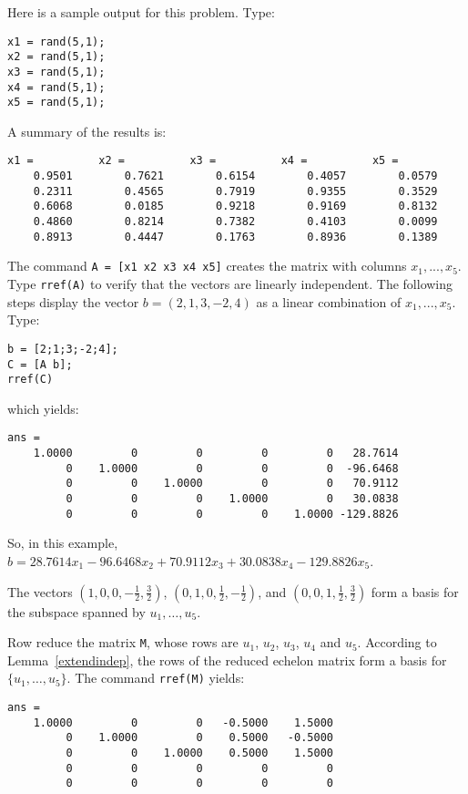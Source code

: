 Here is a sample \Matlab output for this problem.  Type:
\begin{verbatim}
x1 = rand(5,1);
x2 = rand(5,1);
x3 = rand(5,1);
x4 = rand(5,1);
x5 = rand(5,1);
\end{verbatim}
A summary of the results is:
\begin{verbatim}
x1 =          x2 =          x3 =          x4 =          x5 =
    0.9501        0.7621        0.6154        0.4057        0.0579
    0.2311        0.4565        0.7919        0.9355        0.3529
    0.6068        0.0185        0.9218        0.9169        0.8132
    0.4860        0.8214        0.7382        0.4103        0.0099
    0.8913        0.4447        0.1763        0.8936        0.1389
\end{verbatim}
The command {\tt A = [x1 x2 x3 x4 x5]} creates the matrix with columns
$x_1,...,x_5$.  Type {\tt rref(A)} to verify that the vectors are
linearly independent.  The following steps display the vector
$b = (2,1,3,-2,4)$ as a linear combination of $x_1,...,x_5$.  Type:
\begin{verbatim}
b = [2;1;3;-2;4];
C = [A b];
rref(C)
\end{verbatim}
which yields:
\newpage
\begin{verbatim}
ans =
    1.0000         0         0         0         0   28.7614
         0    1.0000         0         0         0  -96.6468
         0         0    1.0000         0         0   70.9112
         0         0         0    1.0000         0   30.0838
         0         0         0         0    1.0000 -129.8826
\end{verbatim}
So, in this example, $b = 28.7614x_1 - 96.6468x_2 + 70.9112x_3
+ 30.0838x_4 - 129.8826x_5$.

\ans The vectors $(1,0,0,-\frac{1}{2},\frac{3}{2})$, $(0,1,0,\frac{1}{2},
-\frac{1}{2})$, and $(0,0,1,\frac{1}{2},\frac{3}{2})$ form a basis
for the subspace spanned by $u_1, \dots ,u_5$.

\soln Row reduce the matrix {\tt M}, whose
rows are $u_1$, $u_2$, $u_3$, $u_4$ and $u_5$.  According to 
Lemma~\ref{extendindep}, the rows of the
reduced echelon matrix form a basis for $\{u_1,\dots ,u_5\}$.  The
command {\tt rref(M)} yields:
\begin{verbatim}
ans =
    1.0000         0         0   -0.5000    1.5000
         0    1.0000         0    0.5000   -0.5000
         0         0    1.0000    0.5000    1.5000
         0         0         0         0         0
         0         0         0         0         0
\end{verbatim}











